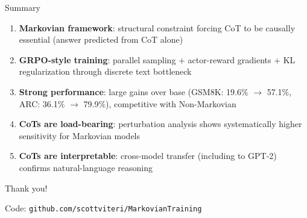 \documentclass[aspectratio=169]{beamer}
\begin{document}
\begin{frame}{Summary}

\begin{enumerate}
    \item \textbf{Markovian framework}: structural constraint forcing CoT to be causally essential (answer predicted from CoT alone)

    \item \textbf{GRPO-style training}: parallel sampling + actor-reward gradients + KL regularization through discrete text bottleneck

    \item \textbf{Strong performance}: large gains over base (GSM8K: 19.6\% $\to$ 57.1\%, ARC: 36.1\% $\to$ 79.9\%), competitive with Non-Markovian

    \item \textbf{CoTs are load-bearing}: perturbation analysis shows systematically higher sensitivity for Markovian models

    \item \textbf{CoTs are interpretable}: cross-model transfer (including to GPT-2) confirms natural-language reasoning
\end{enumerate}

\vspace{0.3cm}
\begin{center}
\Large Thank you!

\normalsize
Code: \texttt{github.com/scottviteri/MarkovianTraining}
\end{center}
\end{frame}
\end{document}
